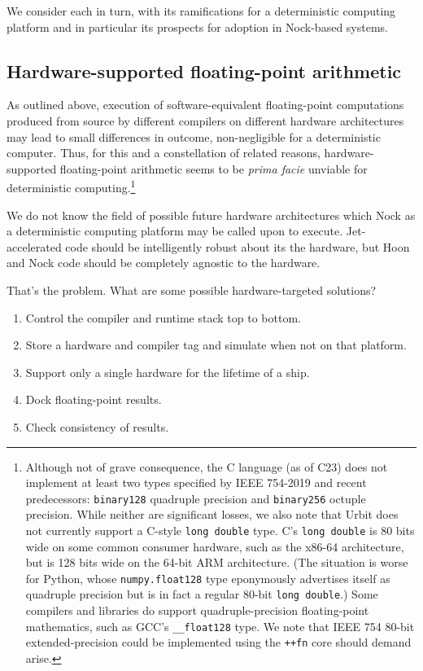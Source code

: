 \documentclass[twoside]{article}
\begin{document}
We consider each in turn, with its ramifications for a deterministic computing platform and in particular its prospects for adoption in Nock-based systems.

\subsection{Hardware-supported floating-point arithmetic}

As outlined above, execution of software-equivalent floating-point computations produced from source by different compilers on different hardware architectures may lead to small differences in outcome, non-negligible for a deterministic computer.  Thus, for this and a constellation of related reasons, hardware-supported floating-point arithmetic seems to be \emph{prima facie} unviable for deterministic computing.\footnote{Although not of grave consequence, the C language (as of C23) does not implement at least two types specified by IEEE 754-2019 and recent predecessors:  \texttt{binary128} quadruple precision and \texttt{binary256} octuple precision.  While neither are significant losses, we also note that Urbit does not currently support a C-style \texttt{long double} type.  C's \texttt{long double} is 80 bits wide on some common consumer hardware, such as the x86-64 architecture, but is 128 bits wide on the 64-bit ARM architecture.  (The situation is worse for Python, whose \texttt{numpy.float128} type eponymously advertises itself as quadruple precision but is in fact a regular 80-bit \texttt{long double}.)  Some compilers and libraries do support quadruple-precision floating-point mathematics, such as GCC's \texttt{\_\_float128} type.  We note that IEEE 754 80-bit extended-precision could be implemented using the \lstinline[style=inlinecode]{++fn} core should demand arise.}

We do not know the field of possible future hardware architectures which Nock as a deterministic computing platform may be called upon to execute.  Jet-accelerated code should be intelligently robust about its the hardware, but Hoon and Nock code should be completely agnostic to the hardware.

That's the problem.  What are some possible hardware-targeted solutions?

\begin{enumerate}
  \item  Control the compiler and runtime stack top to bottom.
  \item  Store a hardware and compiler tag and simulate when not on that platform.
  \item  Support only a single hardware for the lifetime of a ship.
  \item  Dock floating-point results.
  \item  Check consistency of results.
\end{enumerate}
\end{document}
